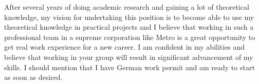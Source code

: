 \documentclass[12pt,a4paper,sans]{moderncv}        %
\begin{document}

After several years of doing academic research and gaining a lot of theoretical knowledge, my vision for undertaking this position is to become able to use my theoretical knowledge in practical projects and I believe that working in such a professional team in a supreme corporation like Metro is a great opportunity to get real work experience for a new career. I am confident in my abilities and believe that working in your group will result in significant advancement of my skills. I should mention that I have German work permit and am ready to start as soon as desired.

 \vspace{3mm}
 
\makeletterclosing
\end{document}
